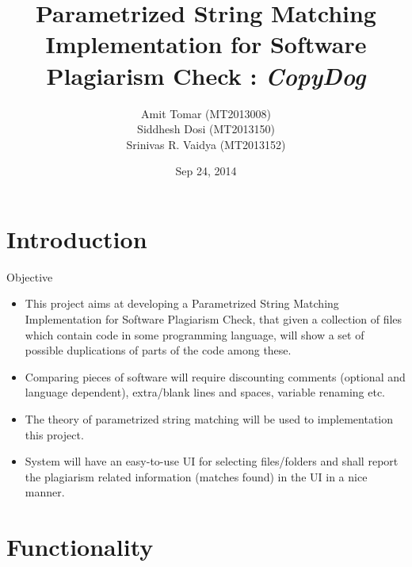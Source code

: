\documentclass[color=usenames,dvipsnames]{beamer}
\title[Software Plagiarism Check]{Parametrized String Matching Implementation for Software Plagiarism Check : \emph{CopyDog}}
\author[]{Amit Tomar (MT2013008) \\Siddhesh Dosi  (MT2013150)\\ Srinivas R. Vaidya  (MT2013152) }
\institute[IIIT-Bangalore]{International Institute of Information Technology, Bangalore}
\date{Sep 24, 2014}
\begin{document}
\begin{frame}
  \titlepage
\end{frame}


\section{Introduction}

\begin{frame}{Objective}

\begin{itemize}

  \setlength{\itemsep}{10pt}
  
\item This project aims at developing a Parametrized String Matching Implementation for Software Plagiarism Check, that given a collection of files which contain code in some programming language, will show a set of possible duplications of parts of the code among these. 
  
\item Comparing pieces of software will require discounting comments (optional and language dependent), extra/blank lines and spaces, variable renaming etc. 
  
\item The theory of parametrized string matching will be used to implementation this project. 

\item  System will have an easy-to-use UI for selecting files/folders and shall report the plagiarism related information (matches found) in the UI in a nice manner.

\end{itemize}
\end{frame}





\section{Functionality}
\end{document}
